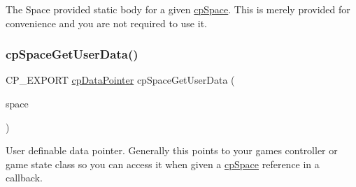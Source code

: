 The Space provided static body for a given \mbox{\hyperlink{structcp_space}{cp\+Space}}. This is merely provided for convenience and you are not required to use it. \mbox{\label{group__cp_space_ga20f6bbc8db7698065052f4502050dc52}} 
\subsubsection{\texorpdfstring{cp\+Space\+Get\+User\+Data()}{cpSpaceGetUserData()}}
{\footnotesize\ttfamily C\+P\+\_\+\+E\+X\+P\+O\+RT \mbox{\hyperlink{group__basic_types_ga2ac2c3c31e21893941f9e4f8ee279447}{cp\+Data\+Pointer}} cp\+Space\+Get\+User\+Data (\begin{DoxyParamCaption}\item[{const \mbox{\hyperlink{structcp_space}{cp\+Space}} $\ast$}]{space }\end{DoxyParamCaption})}

User definable data pointer. Generally this points to your game\textquotesingle{}s controller or game state class so you can access it when given a \mbox{\hyperlink{structcp_space}{cp\+Space}} reference in a callback. 